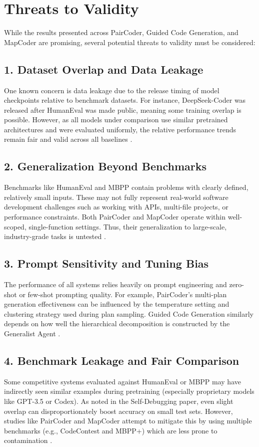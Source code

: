 \documentclass[11pt,a4paper]{article}
\begin{document}
\section{Threats to Validity}

While the results presented across PairCoder, Guided Code Generation, and MapCoder are promising, several potential threats to validity must be considered:

\subsection*{1. Dataset Overlap and Data Leakage}
One known concern is data leakage due to the release timing of model checkpoints relative to benchmark datasets. For instance, DeepSeek-Coder was released after HumanEval was made public, meaning some training overlap is possible. However, as all models under comparison use similar pretrained architectures and were evaluated uniformly, the relative performance trends remain fair and valid across all baselines \cite{zhang2024paircoder}.

\subsection*{2. Generalization Beyond Benchmarks}
Benchmarks like HumanEval and MBPP contain problems with clearly defined, relatively small inputs. These may not fully represent real-world software development challenges such as working with APIs, multi-file projects, or performance constraints. Both PairCoder and MapCoder operate within well-scoped, single-function settings. Thus, their generalization to large-scale, industry-grade tasks is untested \cite{almorsi2025guided}.

\subsection*{3. Prompt Sensitivity and Tuning Bias}
The performance of all systems relies heavily on prompt engineering and zero-shot or few-shot prompting quality. For example, PairCoder’s multi-plan generation effectiveness can be influenced by the temperature setting and clustering strategy used during plan sampling. Guided Code Generation similarly depends on how well the hierarchical decomposition is constructed by the Generalist Agent \cite{zhang2024paircoder, almorsi2025guided}.

\subsection*{4. Benchmark Leakage and Fair Comparison}
Some competitive systems evaluated against HumanEval or MBPP may have indirectly seen similar examples during pretraining (especially proprietary models like GPT-3.5 or Codex). As noted in the Self-Debugging paper, even slight overlap can disproportionately boost accuracy on small test sets. However, studies like PairCoder and MapCoder attempt to mitigate this by using multiple benchmarks (e.g., CodeContest and MBPP+) which are less prone to contamination \cite{zhang2024paircoder, islam2024mapcodermultiagentcodegeneration}.
\end{document}
